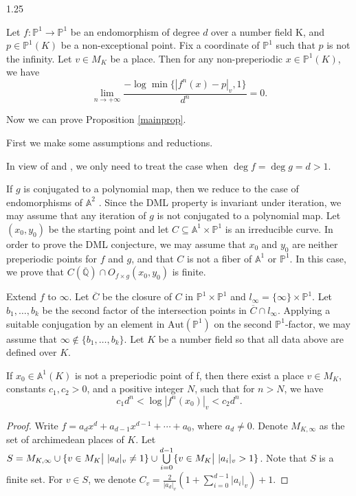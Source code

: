 \documentclass[12pt]{amsart}
\begin{document}
\begin{spacing}{1.25}
\begin{lemma}\label{Sil}
Let $f:\mathbb{P}^1 \to \mathbb{P}^1$ be an endomorphism of degree $d$ over a number field K, and $p\in \mathbb{P}^1(K)$ be a non-exceptional point. Fix a coordinate of $\mathbb{P}^1$ such that $p$ is not the infinity. Let $v\in M_{K}$ be a place. Then for any non-preperiodic $x\in \mathbb{P}^1(K)$, we have
    $$
        \lim_{n \to +\infty} \frac{-\log \min \{|f^n(x)-p|_{v}, 1\}}{d^n} = 0.
    $$
\end{lemma}

Now we can prove Proposition \ref{mainprop}.

    First we make some assumptions and reductions.

    In view of \cite{BGT10} and \cite[Corollary 1.9]{XY}, we only need to treat the case when $\deg f = \deg g = d > 1$.
    
    If $g$ is conjugated to a polynomial map, then we reduce to the case of endomorphisms of $\mathbb{A}^2$ \cite{Xie17}. Since the DML property is invariant under iteration, we may assume that any iteration of $g$ is not conjugated to a polynomial map. Let $(x_0,y_0)$ be the starting point and let $C\subseteq\mathbb{A}^1\times\mathbb{P}^1$ is an irreducible curve. In order to prove the DML conjecture, we may assume that $x_0$ and $y_0$ are neither preperiodic points for $f$ and $g$, and that $C$ is not a fiber of $\mathbb{A}^1$ or $\mathbb{P}^1$. In this case, we prove that $C(\overline{\mathbb{Q}}) \cap O_{f \times g}(x_0,y_0)$ is finite.
    
    Extend $f$ to $\infty$. Let $\overline{C}$ be the closure of $C$ in $\mathbb{P}^1\times\mathbb{P}^1$ and $l_\infty = \{\infty\} \times \mathbb{P}^1$. Let $b_1, \dots, b_k$ be the second factor of the intersection points in $\overline{C} \cap l_\infty$. Applying a suitable conjugation by an element in $\mathrm{Aut}(\mathbb{P}^1)$ on the second $\mathbb{P}^1$-factor, we may assume that $\infty\notin\{b_1,\dots,b_k\}$. Let $K$ be a number field so that all data above are defined over $K$.

\begin{lemma}\label{norm growth}
    If $x_0 \in \mathbb{A}^1(K)$ is not a preperiodic point of f, then there exist a place $v \in M_K$, constants $c_1,c_2>0$, and a positive integer $N$, such that for $n>N$, we have
    $$ c_1 d^n < \log |f^n(x_0)|_v < c_2 d^n. $$
\end{lemma}

\begin{proof}
    Write $f = a_d x^d + a_{d-1} x^{d-1} + \cdots + a_0$, where $a_d \neq 0$. Denote $M_{K,\infty}$ as the set of archimedean places of $K$. Let $S = M_{K,\infty}\cup\{ v\in M_K \big{|}\ |a_d|_v \neq 1\}\cup\bigcup\limits_{i=0}^{d-1}\{ v\in M_K \big{|}\ |a_i|_v > 1\}$. Note that $S$ is a finite set. For $v\in S$, we denote $C_v=\frac{2}{|a_d|_v}(1+\sum\limits_{i=0}^{d-1}|a_i|_v)+1$.
    

\end{proof}
\end{spacing}
\end{document}
